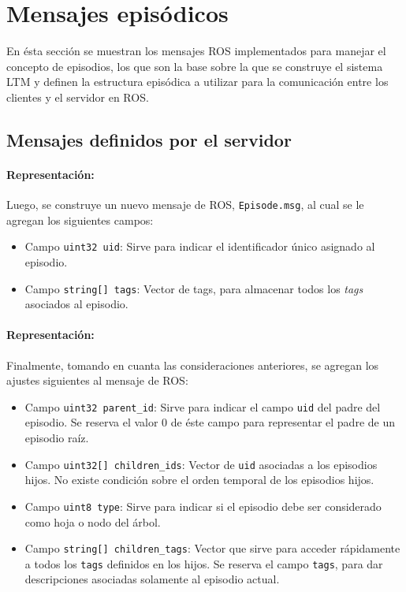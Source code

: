 \section{Mensajes episódicos}

En ésta sección se muestran los mensajes ROS implementados para manejar el concepto de episodios, los que son la base sobre la que se construye el sistema LTM y definen la estructura episódica a utilizar para la comunicación entre los clientes y el servidor en ROS.



\subsection{Mensajes definidos por el servidor}

\paragraph{Representación:}
Luego, se construye un nuevo mensaje de ROS, \texttt{Episode.msg}, al cual se le agregan los siguientes campos:
\begin{itemize}
	\item Campo \texttt{uint32 uid}: Sirve para indicar el identificador único asignado al episodio.
	\item Campo \texttt{string[] tags}: Vector de tags, para almacenar todos los \textit{tags} asociados al episodio.
\end{itemize}

\paragraph{Representación:}
Finalmente, tomando en cuanta las consideraciones anteriores, se agregan los ajustes siguientes al mensaje de ROS:
\begin{itemize}
	\item Campo \texttt{uint32 parent\_id}: Sirve para indicar el campo \texttt{uid} del padre del episodio. Se reserva el valor $0$ de éste campo para representar el padre de un episodio raíz.
	\item Campo \texttt{uint32[] children\_ids}: Vector de \texttt{uid} asociadas a los episodios hijos. No existe condición sobre el orden temporal de los episodios hijos.
	\item Campo \texttt{uint8 type}: Sirve para indicar si el episodio debe ser considerado como hoja o nodo del árbol.
	\item Campo \texttt{string[] children\_tags}: Vector que sirve para acceder rápidamente a todos los \texttt{tags} definidos en los hijos. Se reserva el campo \texttt{tags}, para dar descripciones asociadas solamente al episodio actual.
\end{itemize}

